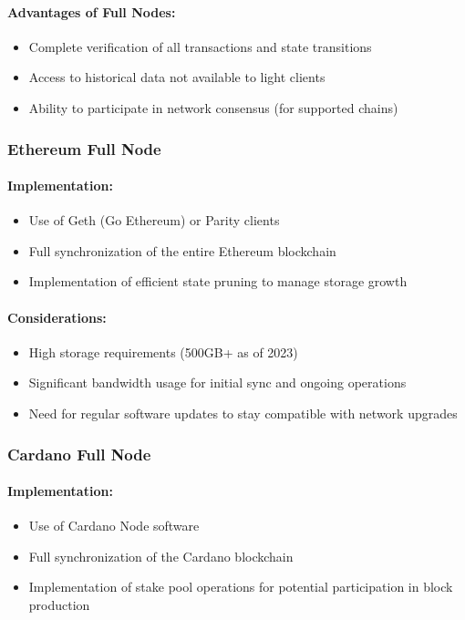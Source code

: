 \documentclass[12pt,a4paper]{article}
\begin{document}
	\paragraph{Advantages of Full Nodes:}
	\begin{itemize}
		\item Complete verification of all transactions and state transitions
		\item Access to historical data not available to light clients
		\item Ability to participate in network consensus (for supported chains)
	\end{itemize}
	
	\subsubsection{Ethereum Full Node}
	\paragraph{Implementation:}
	\begin{itemize}
		\item Use of Geth (Go Ethereum) or Parity clients
		\item Full synchronization of the entire Ethereum blockchain
		\item Implementation of efficient state pruning to manage storage growth
	\end{itemize}
	
	\paragraph{Considerations:}
	\begin{itemize}
		\item High storage requirements (500GB+ as of 2023)
		\item Significant bandwidth usage for initial sync and ongoing operations
		\item Need for regular software updates to stay compatible with network upgrades
	\end{itemize}
	
	\subsubsection{Cardano Full Node}
	\paragraph{Implementation:}
	\begin{itemize}
		\item Use of Cardano Node software
		\item Full synchronization of the Cardano blockchain
		\item Implementation of stake pool operations for potential participation in block production
	\end{itemize}
	
\end{document}
